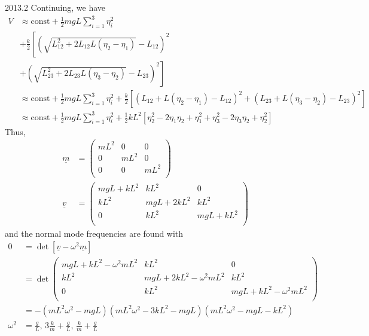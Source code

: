 \documentclass[12pt]{article}
\begin{document}
\begin{solution}{2013.2}
Continuing, we have
\begin{align*}
V & \approx \mathrm{const} + \frac{1}{2} mgL \sum_{i=1}^3 \eta_i^2 \\
& + \frac{k}{2} \left[ \left( \sqrt{ L_{12}^2 + 2L_{12} L (\eta_2 - \eta_1)} - L_{12} \right)^2 \right. \\
& + \left. \left( \sqrt{ L_{23}^2 + 2L_{23} L (\eta_3 - \eta_2)} - L_{23} \right)^2 \right] \\
& \approx \mathrm{const} + \frac{1}{2} mgL \sum_{i=1}^3 \eta_i^2
+ \frac{k}{2} \left[ (L_{12} + L (\eta_2 - \eta_1) - L_{12})^2
+ (L_{23} + L (\eta_3 - \eta_2) - L_{23})^2 \right] \\
& \approx \mathrm{const} + \frac{1}{2} mgL \sum_{i=1}^3 \eta_i^2
+ \frac{1}{2} kL^2 \left[ \eta_2^2 - 2\eta_1 \eta_2 + \eta_1^2
+ \eta_3^2 - 2\eta_3 \eta_2 + \eta_2^2 \right]
\end{align*}
Thus,
\begin{align*}
\underline{m} & = \left( \begin{array}{ccc}
mL^2 & 0 & 0 \\
0 & mL^2 & 0 \\
0 & 0 & mL^2 \\
\end{array} \right) \\
\underline{v} & = \left( \begin{array}{ccc}
mgL + kL^2 & kL^2 & 0 \\
kL^2 & mgL + 2kL^2 & kL^2 \\
0 & kL^2 & mgL + kL^2 \\
\end{array} \right)
\end{align*}
and the normal mode frequencies are found with
\begin{align*}
0 & = \det [ \underline{v} - \omega^2 \underline{m} ] \\
& = \det \left( \begin{array}{ccc}
mgL + kL^2 - \omega^2 mL^2 & kL^2 & 0 \\
kL^2 & mgL + 2kL^2 - \omega^2 mL^2 & kL^2 \\
0 & kL^2 & mgL + kL^2 - \omega^2 mL^2 \\
\end{array} \right) \\
& = -(mL^2 \omega^2 - mgL) (mL^2 \omega^2 - 3kL^2 - mgL) (mL^2 \omega^2 - mgL - kL^2) \\
\omega^2 & = \frac{g}{L}, \, 3 \frac{k}{m} + \frac{g}{L}, \, \frac{k}{m} + \frac{g}{L}
\end{align*}

\end{solution}
\end{document}
